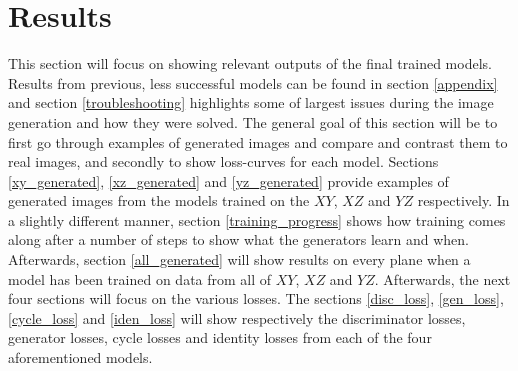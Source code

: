 \documentclass[12pt, fleqn, titlepage]{article}
\newcommand{\1}[1]{\mathds{1}\left[#1\right]}
\begin{document}
\section{Results}\label{results}
This section will focus on showing relevant outputs of the final trained models. Results from previous, less successful models can be found in section \ref{appendix} and section \ref{troubleshooting} highlights some of largest issues during the image generation and how they were solved. The general goal of this section will be to first go through examples of generated images and compare and contrast them to real images, and secondly to show loss-curves for each model. Sections \ref{xy_generated}, \ref{xz_generated} and \ref{yz_generated} provide examples of generated images from the models trained on the $XY$, $XZ$ and $YZ$ respectively. In a slightly different manner, section \ref{training_progress} shows how training comes along after a number of steps to show what the generators learn and when. Afterwards, section \ref{all_generated} will show results on every plane when a model has been trained on data from all of $XY$, $XZ$ and $YZ$. Afterwards, the next four sections will focus on the various losses. The sections \ref{disc_loss}, \ref{gen_loss}, \ref{cycle_loss} and \ref{iden_loss} will show respectively the discriminator losses, generator losses, cycle losses and identity losses from each of the four aforementioned models.
\end{document}
